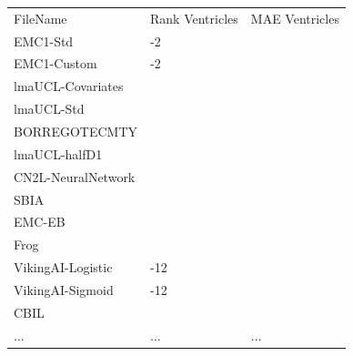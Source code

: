 \documentclass[8pt,xcolor=table,aspectratio=169]{beamer}
\begin{document}
\begin{frame}
\begin{columns}[t]
\begin{column}{0.4\textwidth}
\begin{table}
 \fontsize{6}{8}\selectfont
\begin{tabular}{l|>{\centering\arraybackslash}m{1cm}|>{\centering\arraybackslash}m{1cm}}
 \Xhline{2.5\arrayrulewidth}
                     FileName & Rank Ventricles &  MAE Ventricles \\
 \Xhline{2.5\arrayrulewidth}
\rowcolor{winnerCol} EMC1-Std &        1-2 &     0.4116 \\
  \rowcolor{winnerCol} EMC1-Custom &        1-2 &     0.4116 \\
            lmaUCL-Covariates &          3 &     0.4155 \\
                   lmaUCL-Std &          4 &     0.4207\\
                BORREGOTECMTY &          5 &     0.4299  \\
                lmaUCL-halfD1 &          6 &     0.4402  \\
           CN2L-NeuralNetwork &          7 &     0.4409  \\
                         SBIA &          8 &     0.4410  \\
                       EMC-EB &          9 &     0.4466  \\
                         Frog &         10 &     0.4469 \\
            VikingAI-Logistic &      11-12 &     0.4534 \\
             VikingAI-Sigmoid &      11-12 &     0.4534 \\
                         CBIL &         13 &     0.4625  \\
                         ...  &       ... &      ...   \\

\end{tabular}
\end{table}
\end{column}
\end{columns}
\end{frame}
\end{document}
